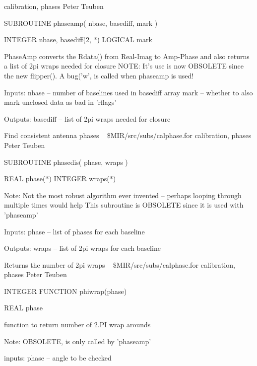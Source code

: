 \newline {} calibration, phases
\newline {} Peter Teuben
\par{\tenpoint
{\eightpoint\begintt
        SUBROUTINE phaseamp( nbase, basediff, mark )

        INTEGER nbase, basediff(2, *)
        LOGICAL mark

       PhaseAmp converts the Rdata() from Real-Imag to Amp-Phase
       and also returns a list of 2pi wraps needed for closure
 NOTE:
       It's use is now OBSOLETE since the new flipper(). A bug('w',
       is called when phaseamp is used!
       
  Inputs:
       nbase    -- number of baselines used in basediff array
       mark     -- whether to also mark unclosed data as bad in 'rflags'

  Outputs:
       basediff -- list of 2pi wraps needed for closure
\endtt}
\par}
%
\noindent Find consistent antenna phases
\newline \ 
\newline {} \$MIR/src/subs/calphase.for
\newline {} calibration, phases
\newline {} Peter Teuben
\par{\tenpoint
{\eightpoint\begintt
        SUBROUTINE phasedis( phase, wraps )

        REAL    phase(*)
        INTEGER wraps(*)

  Note: Not the most robust algorithm ever invented -- perhaps looping
        through multiple times would help
        This subroutine is OBSOLETE since it is used with 'phaseamp'

  Inputs:
       phase -- list of phases for each baseline

  Outputs:
       wraps -- list of 2pi wraps for each baseline
\endtt}
\par}
%
\noindent Returns the number of 2pi wraps
\newline \ 
\newline {} \$MIR/src/subs/calphase.for
\newline {} calibration, phases
\newline \abox{Responsible:} Peter Teuben
\par{\tenpoint
{\eightpoint\begintt
        INTEGER FUNCTION phiwrap(phase)

        REAL phase

       function to return number of 2.PI wrap arounds

       Note: OBSOLETE, is only called by 'phaseamp'

       inputs:
           phase       -- angle to be checked
\endtt}
\par}
